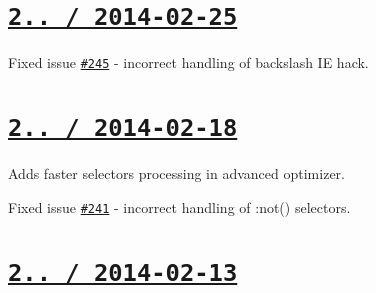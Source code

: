 \section*{\href{https://github.com/jakubpawlowicz/clean-css/compare/v2.1.1...v2.1.2}{\tt 2.. / 2014-\/02-\/25} }


\begin{DoxyItemize}
\item Fixed issue \href{https://github.com/jakubpawlowicz/clean-css/issues/245}{\tt \#245} -\/ incorrect handling of backslash IE hack.
\end{DoxyItemize}

\section*{\href{https://github.com/jakubpawlowicz/clean-css/compare/v2.1.0...v2.1.1}{\tt 2.. / 2014-\/02-\/18} }


\begin{DoxyItemize}
\item Adds faster selectors processing in advanced optimizer.
\item Fixed issue \href{https://github.com/jakubpawlowicz/clean-css/issues/241}{\tt \#241} -\/ incorrect handling of {\ttfamily \+:not()} selectors.
\end{DoxyItemize}

\section*{\href{https://github.com/jakubpawlowicz/clean-css/compare/v2.0.8...v2.1.0}{\tt 2.. / 2014-\/02-\/13} }


